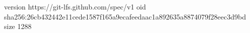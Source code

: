 version https://git-lfs.github.com/spec/v1
oid sha256:26cb432442e11cede1587f165a9ecafeedaac1a892635a8874079f28eec3d9bd
size 1288
